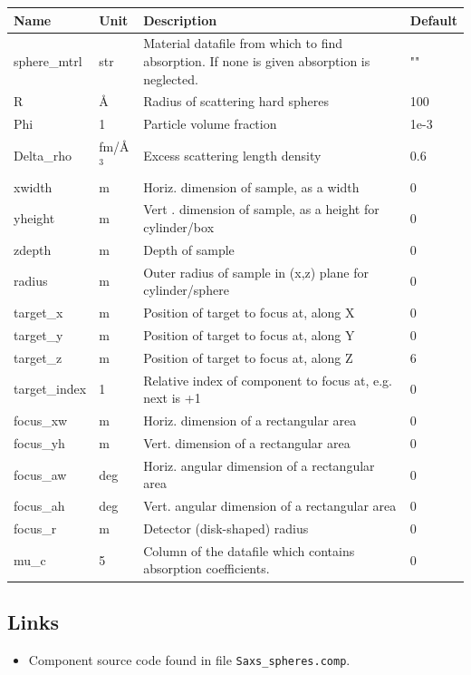 \begin{longtable}{p{}p{}p{}p{}}
\toprule
\textbf{Name} & \textbf{Unit} & \textbf{Description} & \textbf{Default} \\
\midrule
\endhead
sphere\_mtrl & str & Material datafile from which to find absorption. If none is given absorption is neglected. & "" \\
R & \AA{} & Radius of scattering hard spheres & 100 \\
Phi & 1 & Particle volume fraction & 1e-3 \\
Delta\_rho & fm/\AA{}$^{3}$ & Excess scattering length density & 0.6 \\
xwidth & m & Horiz. dimension of sample, as a width & 0 \\
yheight & m & Vert . dimension of sample, as a height for cylinder/box & 0 \\
zdepth & m & Depth of sample & 0 \\
radius & m & Outer radius of sample in (x,z) plane for cylinder/sphere & 0 \\
target\_x & m & Position of target to focus at, along X & 0 \\
target\_y & m & Position of target to focus at, along Y & 0 \\
target\_z & m & Position of target to focus at, along Z & 6 \\
target\_index & 1 & Relative index of component to focus at, e.g. next is +1 & 0 \\
focus\_xw & m & Horiz. dimension of a rectangular area & 0 \\
focus\_yh & m & Vert.  dimension of a rectangular area & 0 \\
focus\_aw & deg & Horiz. angular dimension of a rectangular area & 0 \\
focus\_ah & deg & Vert.  angular dimension of a rectangular area & 0 \\
focus\_r & m & Detector (disk-shaped) radius & 0 \\
mu\_c & 5 & Column of the datafile which contains absorption coefficients. & 0 \\
\bottomrule
\end{longtable}

\subsection*{Links}
\begin{itemize}
  \item Component source code found in file \texttt{Saxs\_spheres.comp}.
\end{itemize}
